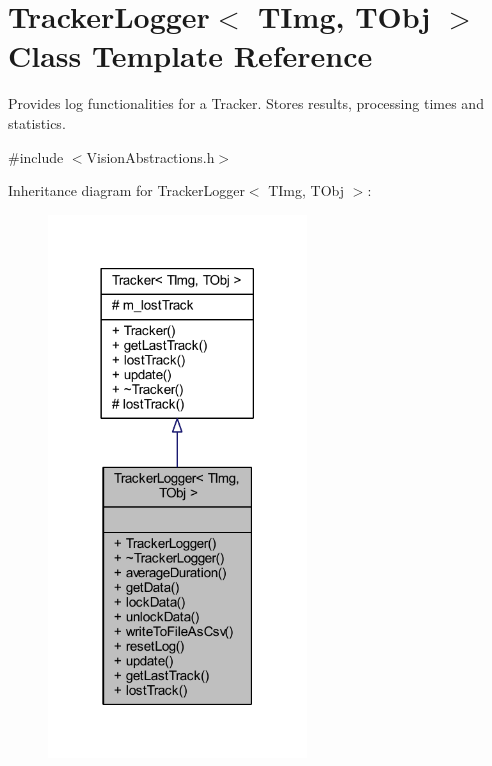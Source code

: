 \hypertarget{class_vision_core_1_1_abstractions_1_1_tracker_logger}{}\section{Tracker\+Logger$<$ T\+Img, T\+Obj $>$ Class Template Reference}
\label{class_vision_core_1_1_abstractions_1_1_tracker_logger}


Provides log functionalities for a Tracker. Stores results, processing times and statistics.  




{\ttfamily \#include $<$Vision\+Abstractions.\+h$>$}



Inheritance diagram for Tracker\+Logger$<$ T\+Img, T\+Obj $>$\+:
\nopagebreak
\begin{figure}[H]
\begin{center}
\leavevmode
\includegraphics[width=194pt]{class_vision_core_1_1_abstractions_1_1_tracker_logger__inherit__graph}
\end{center}
\end{figure}


